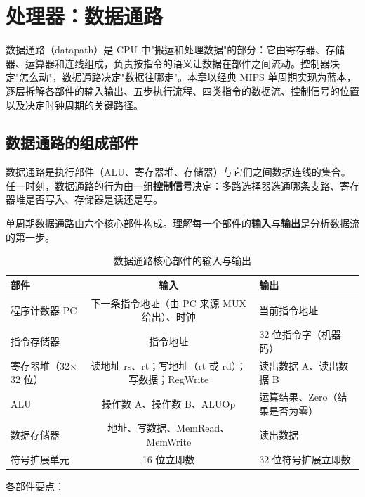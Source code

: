 \clearpage
\vspace*{\fill}
\section{处理器：数据通路}
\vspace*{\fill}
\clearpage


数据通路（datapath）是 CPU 中"搬运和处理数据"的部分：它由寄存器、存储器、运算器和连线组成，负责按指令的语义让数据在部件之间流动。控制器决定"怎么动"，数据通路决定"数据往哪走"。本章以经典 MIPS 单周期实现为蓝本，逐层拆解各部件的输入输出、五步执行流程、四类指令的数据流、控制信号的位置以及决定时钟周期的关键路径。

\subsection{数据通路的组成部件}

\begin{definition}[数据通路]
数据通路是执行部件（ALU、寄存器堆、存储器）与它们之间数据连线的集合。任一时刻，数据通路的行为由一组\textbf{控制信号}决定：多路选择器选通哪条支路、寄存器堆是否写入、存储器是读还是写。
\end{definition}

单周期数据通路由六个核心部件构成。理解每一个部件的\textbf{输入}与\textbf{输出}是分析数据流的第一步。

\begin{table}[H]
\centering
\caption{数据通路核心部件的输入与输出}
\label{tab:datapath_components}
\begin{tabulary}{\textwidth}{LCL}
\toprule
\textbf{部件} & \textbf{输入} & \textbf{输出} \\
\midrule
程序计数器 PC & 下一条指令地址（由 PC 来源 MUX 给出）、时钟 & 当前指令地址 \\
指令存储器 & 指令地址 & 32 位指令字（机器码） \\
寄存器堆（32$\times$32 位） & 读地址 rs、rt；写地址（rt 或 rd）；写数据；RegWrite & 读出数据 A、读出数据 B \\
ALU & 操作数 A、操作数 B、ALUOp & 运算结果、Zero（结果是否为零） \\
数据存储器 & 地址、写数据、MemRead、MemWrite & 读出数据 \\
符号扩展单元 & 16 位立即数 & 32 位符号扩展立即数 \\
\bottomrule
\end{tabulary}
\end{table}

各部件要点：

